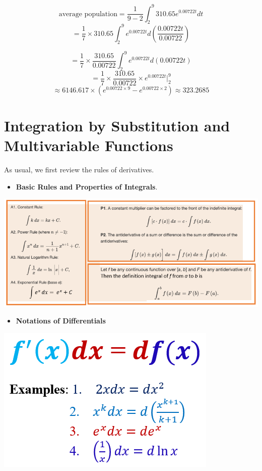 \documentclass[
]{book}
\providecommand{\tightlist}{%
  \setlength{\itemsep}{0pt}\setlength{\parskip}{0pt}}
\begin{document}
\[
\text{average population} = \frac{1}{9-2} \int_{2}^{9}310.65 e^{0.00722t} dt
\]
\[
=\frac{1}{7} \times 310.65  \int_{2}^{9}e^{0.00722t} d\left(\frac{0.00722t}{0.00722} \right)
\]

\[
=\frac{1}{7} \times \frac{310.65}{0.00722}  \int_{2}^{9}e^{0.00722t} d (0.00722t)
\]
\[
= \frac{1}{7} \times \frac{310.65}{0.00722} \times e^{0.00722t}\Big|_2^9
\]
\[
\approx 6146.617\times(e^{0.00722\times 9} - e^{0.00722\times 2}) \approx 323.2685
\]

\hypertarget{integration-by-substitution-and-multivariable-functions}{%
\chapter{Integration by Substitution and Multivariable Functions}\label{integration-by-substitution-and-multivariable-functions}}

As usual, we first review the rules of derivatives.

\begin{itemize}
\tightlist
\item
  \textbf{Basic Rules and Properties of Integrals}.
\end{itemize}

\begin{center}\includegraphics[width=0.95\linewidth]{img13/w13-ImportantProperties} \end{center}

\hfill\break

\begin{itemize}
\tightlist
\item
  \textbf{Notations of Differentials}
\end{itemize}

\begin{center}\includegraphics[width=0.55\linewidth]{img13/w13-differentialNotation} \end{center}
\end{document}

